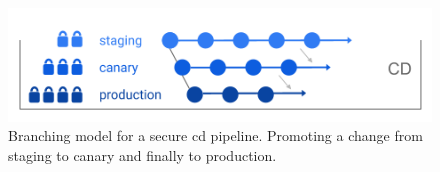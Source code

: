 \documentclass[../main.tex]{subfiles}
\begin{document}
    \begin{figure}[h]
        \centering
        \includegraphics[width=.9\linewidth]{img/out_git_branching_cd_v3.png}
        \captionsetup{justification=centering}
        \caption{
            Branching model for a secure \acrlong{cd} pipeline.
            Promoting a change from staging to canary and finally to production.
        }
        \label{fig:git_branching_prod}
    \end{figure}
\end{document}
